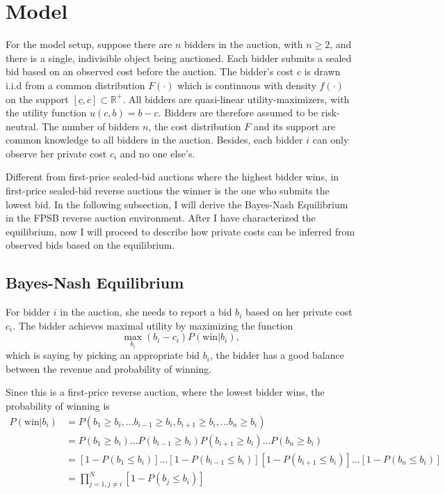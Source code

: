 \documentclass[11pt]{article}
\begin{document}
\section{Model}

For the model setup, suppose there are $n$ bidders in the auction, with 
$n \geq 2$, and 
there is a single, indivisible object being auctioned. Each bidder submits 
a sealed bid based on an observed cost before the auction. The 
bidder's cost $c$ is drawn i.i.d from a common distribution $F(\cdot)$ which is 
continuous with density $f(\cdot)$ on the support $[\underline{c}, \overline{c}] \subset \mathbb{R}^{+}$. 
All bidders are quasi-linear utility-maximizers, with the utility function 
$u(c, b) = b - c$. Bidders are therefore assumed to be risk-neutral. 
The number of bidders $n$, the cost distribution $F$ and its support are common 
knowledge to all bidders in the auction. Besides, each bidder $i$ can only observe her 
private cost $c_i$ and no one else's. 

Different from first-price sealed-bid auctions where 
the highest bidder wins, in first-price sealed-bid reverse 
auctions the winner is the one who submits the 
lowest bid. In the following subsection, I will derive the 
Bayes-Nash Equilibrium in the FPSB reverse auction environment.
After I have characterized the equilibrium, now I will proceed to describe how 
private costs can be inferred from observed bids based on the equilibrium. 

\subsection{Bayes-Nash Equilibrium}
For bidder $i$ in the auction, she needs to report a bid $b_i$ based on 
her private cost $c_i$. The bidder achieves maximal utility 
by maximizing the function 
$$ \max_{b_i} (b_i - c_i)P(\text{win}|b_i), $$ 
which is saying by picking an appropriate bid $b_i$, the bidder 
has a good balance between the revenue and probability of winning. 

Since this is a first-price reverse auction, where the lowest bidder wins, 
the probability of winning is 
\begin{align*}
    P(\text{win}|b_i) &= P(b_1 \geq b_i, ... b_{i-1} \geq b_i, b_{i+1} \geq b_i, ... b_n \geq b_i) \\
        &= P(b_1 \geq b_i) ... P(b_{i-1} \geq b_i) P(b_{i+1} \geq b_i) ... P(b_n \geq b_i) \\
        &= [1-P(b_1 \leq b_i)] ... [1-P(b_{i-1} \leq b_i)][1-P(b_{i+1} \leq b_i)] ... [1-P(b_n \leq b_i)] \\
        &= \prod_{j=1, j \neq i}^{N}[1-P(b_j \leq b_i)]
\end{align*}
\end{document}
